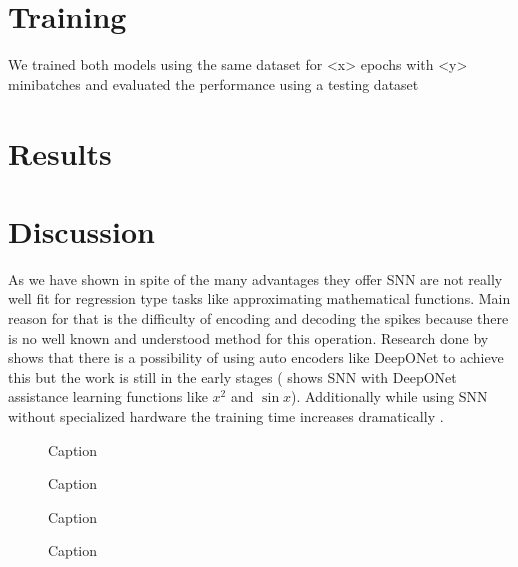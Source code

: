 \documentclass{article}
\begin{document}
\section{Training}

We trained both models using the same dataset for <x> epochs with <y> minibatches and evaluated the performance using a testing dataset 


\section{Results}



\section{Discussion}

As we have shown in spite of the many advantages they offer SNN are not really well fit for regression type tasks like approximating mathematical functions. Main reason for that is the difficulty of encoding and decoding the spikes because there is no well known and understood method for this operation. Research done by \cite{kahana_function_2022} shows that there is a possibility of using auto encoders like DeepONet \cite{lu_learning_2021} to achieve this but the work is still in the early stages (\cite{kahana_function_2022} shows SNN with DeepONet assistance learning functions like $x^2$ and $\sin{x}$). Additionally while using SNN without specialized hardware\cite{bouvier_spiking_2019} the training time increases dramatically \cite{kahana_function_2022}.





\begin{figure}
    
    \caption{Caption}
    \label{fig:my_label}
\end{figure}

\begin{figure}

    \caption{Caption}
    \label{fig:my_label}
\end{figure}

\begin{figure}

    \caption{Caption}
    \label{fig:my_label}
\end{figure}

\begin{figure}

    \caption{Caption}
    \label{fig:my_label}
\end{figure}
\end{document}

